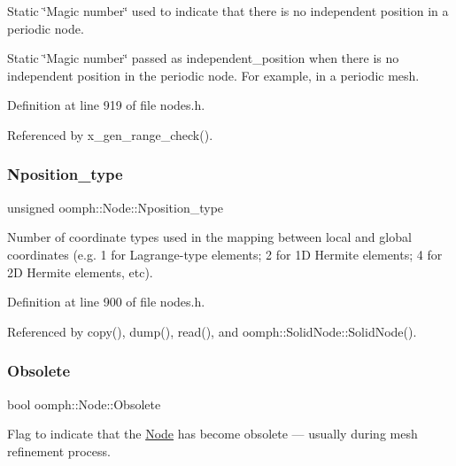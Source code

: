 Static \char`\"{}\+Magic number\char`\"{} used to indicate that there is no independent position in a periodic node. 

Static \char`\"{}\+Magic number\char`\"{} passed as independent\+\_\+position when there is no independent position in the periodic node. For example, in a periodic mesh. 

Definition at line 919 of file nodes.\+h.



Referenced by x\+\_\+gen\+\_\+range\+\_\+check().

\mbox{\label{classoomph_1_1Node_aa5419b3f46cb65976e1e1311eed9419d}} 
\subsubsection{\texorpdfstring{Nposition\+\_\+type}{Nposition\_type}}
{\footnotesize\ttfamily unsigned oomph\+::\+Node\+::\+Nposition\+\_\+type\hspace{0.3cm}{\ttfamily [protected]}}



Number of coordinate types used in the mapping between local and global coordinates (e.\+g. 1 for Lagrange-\/type elements; 2 for 1D Hermite elements; 4 for 2D Hermite elements, etc). 



Definition at line 900 of file nodes.\+h.



Referenced by copy(), dump(), read(), and oomph\+::\+Solid\+Node\+::\+Solid\+Node().

\mbox{\label{classoomph_1_1Node_ae25c446374781036779c46bd8c1a2d74}} 
\subsubsection{\texorpdfstring{Obsolete}{Obsolete}}
{\footnotesize\ttfamily bool oomph\+::\+Node\+::\+Obsolete\hspace{0.3cm}{\ttfamily [protected]}}



Flag to indicate that the \hyperlink{classoomph_1_1Node}{Node} has become obsolete --- usually during mesh refinement process. 



